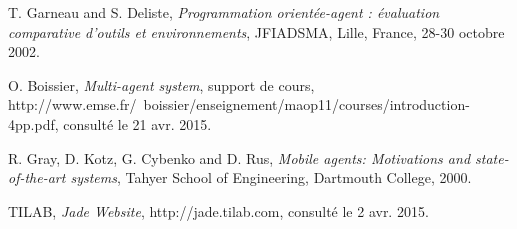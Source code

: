 \documentclass[conference]{IEEEtran}
\begin{document}
\begin{thebibliography}{56}

T. Garneau and S. Deliste, \emph{Programmation orientée-agent : évaluation comparative d'outils et environnements}, JFIADSMA, Lille, France, 28-30 octobre 2002.

O. Boissier, \emph{Multi-agent system}, support de cours, http://www.emse.fr/~boissier/enseignement/maop11/courses/introduction-4pp.pdf, consulté le 21 avr. 2015.

R. Gray, D. Kotz, G. Cybenko and D. Rus, \emph{Mobile agents: Motivations and state-of-the-art systems}, Tahyer School of Engineering, Dartmouth College, 2000.

TILAB, \emph{Jade Website}, http://jade.tilab.com, consulté le 2 avr. 2015.

\end{thebibliography}

\end{document}
